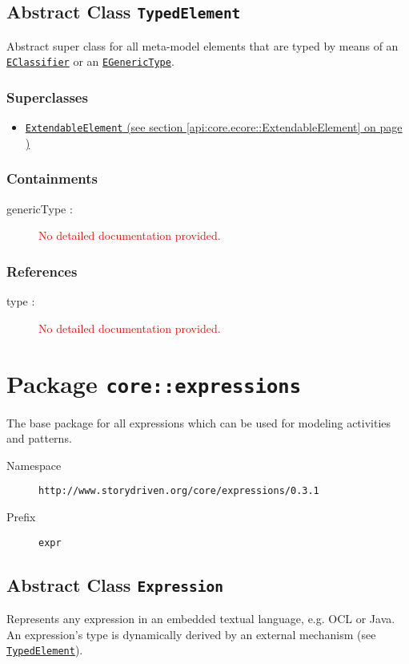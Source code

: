 \subsection{Abstract Class \texttt{TypedElement}}
\label{api:core.ecore::TypedElement}
Abstract super class for all meta-model elements that are typed by means of an \hyperref[EClassifier]{\texttt{EClassifier}} or an \hyperref[EGenericType]{\texttt{EGenericType}}.
\subsubsection*{Superclasses}
\begin{itemize}
\item \hyperref[api:core.ecore::ExtendableElement]{\texttt{ExtendableElement} (see section \ref*{api:core.ecore::ExtendableElement} on page \pageref*{api:core.ecore::ExtendableElement})}
\end{itemize}
\subsubsection*{Containments}
\begin{description}
\item[genericType : ] \textcolor{red}{No detailed documentation provided.}
\end{description}
\subsubsection*{References}
\begin{description}
\item[type : ] \textcolor{red}{No detailed documentation provided.}
\end{description}
\section{Package \texttt{core::expressions}}
\label{api:core.ecore::expressions}
The base package for all expressions which can be used for modeling activities and patterns.
\begin{description}
\item[Namespace] \texttt{http://www.storydriven.org/core/expressions/0.3.1}
\item[Prefix] \texttt{expr}
\end{description}
\subsection{Abstract Class \texttt{Expression}}
\label{api:core.ecore::expressions:Expression}
Represents any expression in an embedded textual language, e.g. OCL or Java. An expression's type is dynamically derived by an external mechanism (see \hyperref[TypedElement]{\texttt{TypedElement}}).
